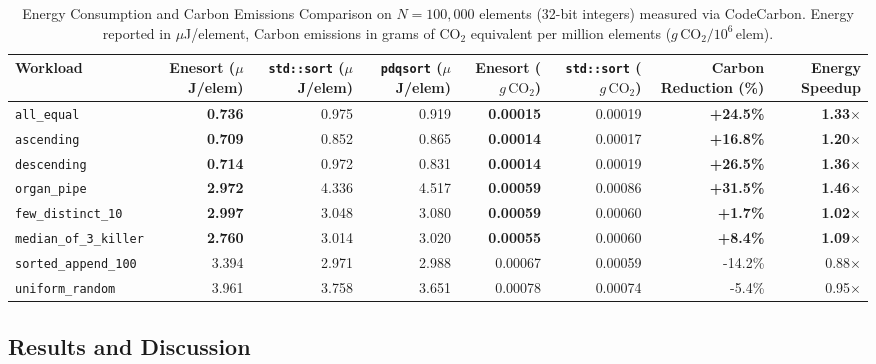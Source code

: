 \documentclass[journal]{IEEEtran}
\begin{document}
\begin{table}[t]
\centering
\caption{Energy Consumption and Carbon Emissions Comparison on $N=100,000$ elements (32-bit integers) measured via CodeCarbon. Energy reported in $\mu$J/element, Carbon emissions in grams of $\text{CO}_2$ equivalent per million elements ($g\,\text{CO}_2 / 10^6\,\text{elem}$).}
\label{tab:carbon_results}
\begin{tabular}{lrrrrrrr}
\toprule
Workload & Enesort ($\mu$J/elem) & \texttt{std::sort} ($\mu$J/elem) & \texttt{pdqsort} ($\mu$J/elem) & Enesort ($g\,\text{CO}_2$) & \texttt{std::sort} ($g\,\text{CO}_2$) & Carbon Reduction (\%) & Energy Speedup \\
\midrule
\texttt{all\_equal} & \textbf{0.736} & 0.975 & 0.919 & \textbf{0.00015} & 0.00019 & \textbf{+24.5\%} & \textbf{1.33$\times$} \\
\texttt{ascending} & \textbf{0.709} & 0.852 & 0.865 & \textbf{0.00014} & 0.00017 & \textbf{+16.8\%} & \textbf{1.20$\times$} \\
\texttt{descending} & \textbf{0.714} & 0.972 & 0.831 & \textbf{0.00014} & 0.00019 & \textbf{+26.5\%} & \textbf{1.36$\times$} \\
\texttt{organ\_pipe} & \textbf{2.972} & 4.336 & 4.517 & \textbf{0.00059} & 0.00086 & \textbf{+31.5\%} & \textbf{1.46$\times$} \\
\texttt{few\_distinct\_10} & \textbf{2.997} & 3.048 & 3.080 & \textbf{0.00059} & 0.00060 & \textbf{+1.7\%} & \textbf{1.02$\times$} \\
\texttt{median\_of\_3\_killer} & \textbf{2.760} & 3.014 & 3.020 & \textbf{0.00055} & 0.00060 & \textbf{+8.4\%} & \textbf{1.09$\times$} \\
\texttt{sorted\_append\_100} & 3.394 & 2.971 & 2.988 & 0.00067 & 0.00059 & -14.2\% & 0.88$\times$ \\
\texttt{uniform\_random} & 3.961 & 3.758 & 3.651 & 0.00078 & 0.00074 & -5.4\% & 0.95$\times$ \\
\bottomrule
\end{tabular}
\end{table}

\subsection{Results and Discussion}
\end{document}
